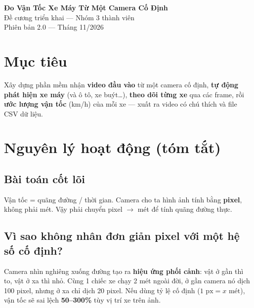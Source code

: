 \documentclass[11pt,a4paper]{article}
\begin{document}
\begin{center}
    \vspace{0.3cm}
    {\huge\bfseries\sffamily\color{primary} Đo Vận Tốc Xe Máy Từ Một Camera Cố Định}\\[8pt]
    {\large\sffamily\color{darkgray} Đề cương triển khai --- Nhóm 3 thành viên}\\[4pt]
    {\small\sffamily\color{gray} Phiên bản 2.0 --- Tháng 11/2026}
    \vspace{0.4cm}
\end{center}

\section{Mục tiêu}

\begin{tcolorbox}[commonbox, colback=lightbg, colframe=primary]
Xây dựng phần mềm nhận \textbf{video đầu vào} từ một camera cố định, \textbf{tự động phát hiện xe máy} (và ô tô, xe buýt\ldots), \textbf{theo dõi từng xe} qua các frame, rồi \textbf{ước lượng vận tốc} (km/h) của mỗi xe --- xuất ra video có chú thích và file CSV dữ liệu.
\end{tcolorbox}

\section{Nguyên lý hoạt động (tóm tắt)}

\subsection{Bài toán cốt lõi}
Vận tốc = quãng đường / thời gian. Camera cho ta hình ảnh tính bằng \textbf{pixel}, không phải mét. Vậy phải chuyển pixel $\rightarrow$ mét để tính quãng đường thực.

\subsection{Vì sao không nhân đơn giản pixel với một hệ số cố định?}
Camera nhìn nghiêng xuống đường tạo ra \textbf{hiệu ứng phối cảnh}: vật ở gần thì to, vật ở xa thì nhỏ. Cùng 1 chiếc xe chạy 2 mét ngoài đời, ở gần camera nó dịch 100 pixel, nhưng ở xa chỉ dịch 20 pixel. Nếu dùng tỷ lệ cố định ($1 \text{ px} = x \text{ mét}$), vận tốc sẽ sai lệch \textbf{50--300\%} tùy vị trí xe trên ảnh.
\end{document}
